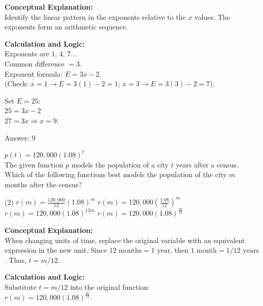 \documentclass[11pt,paper=a4,answers]{exam}
\begin{document}
\begin{questions}
\begin{solution}
\textbf{Conceptual Explanation:} \\
Identify the linear pattern in the exponents relative to the $x$ values. The exponents form an arithmetic sequence.

\vspace{20pt}

\textbf{Calculation and Logic:} \\
Exponents are 1, 4, 7... \\
Common difference $= 3$. \\
Exponent formula: $E = 3x - 2$. \\
(Check: $x=1 \rightarrow E=3(1)-2=1$; $x=3 \rightarrow E=3(3)-2=7$).

\vspace{10pt}

Set $E = 25$: \\
$25 = 3x - 2$ \\
$27 = 3x \Rightarrow x = 9$.

\vspace{25pt}

Answer: \colorbox{yellow!100}{9}
\end{solution}

\vspace{40pt}

\question
$p(t) = 120,000(1.08)^t$ \\
The given function $p$ models the population of a city $t$ years after a census. Which of the following functions best models the population of the city $m$ months after the census?
\begin{tasks}(2)
    \task $r(m) = \frac{120,000}{12}(1.08)^m$
    \task $r(m) = 120,000(\frac{1.08}{12})^m$
    \task $r(m) = 120,000(1.08)^{12m}$
    \task $r(m) = 120,000(1.08)^{\frac{m}{12}}$
\end{tasks}

\begin{solution}
\textbf{Conceptual Explanation:} \\
When changing units of time, replace the original variable with an equivalent expression in the new unit. Since $12 \text{ months} = 1 \text{ year}$, then $1 \text{ month} = 1/12 \text{ years}$. Thus, $t = m/12$.

\vspace{20pt}

\textbf{Calculation and Logic:} \\
Substitute $t = m/12$ into the original function: \\
$r(m) = 120,000(1.08)^{\frac{m}{12}}$.


\end{solution}
\end{questions}
\end{document}
